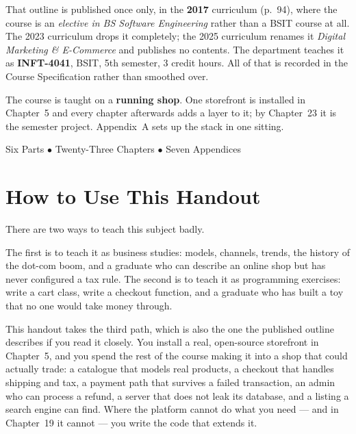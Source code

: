 \begin{center}
\begin{tcolorbox}[enhanced, width=0.86\textwidth, colback=lightbg,
  colframe=primary, boxrule=0pt, leftrule=4pt, arc=2pt, top=6pt, bottom=6pt]
\smallskip
That outline is published once only, in the \textbf{2017} curriculum (p.~94),
where the course is an \emph{elective in BS Software Engineering} rather than a
BSIT course at all. The 2023 curriculum drops it completely; the 2025
curriculum renames it \emph{Digital Marketing \& E-Commerce} and publishes no
contents. The department teaches it as \textbf{INFT-4041}, BSIT, 5th semester,
3 credit hours. All of that is recorded in the Course Specification rather
than smoothed over.

\smallskip
The course is taught on a \textbf{running shop}. One storefront is installed in
Chapter~5 and every chapter afterwards adds a layer to it; by Chapter~23 it is
the semester project. Appendix~A sets up the stack in one sitting.
\end{tcolorbox}

\vspace{0.9cm}
{\small\color{gray!60!black}Six Parts $\bullet$ Twenty-Three Chapters $\bullet$ Seven Appendices}
\vspace{1cm}
\end{center}

\newpage

\chapter*{How to Use This Handout}

There are two ways to teach this subject badly.

The first is to teach it as business studies: models, channels, trends, the
history of the dot-com boom, and a graduate who can describe an online shop but
has never configured a tax rule. The second is to teach it as programming
exercises: write a cart class, write a checkout function, and a graduate who has
built a toy that no one would take money through.

This handout takes the third path, which is also the one the published outline
describes if you read it closely. You install a real, open-source storefront in
Chapter~5, and you spend the rest of the course making it into a shop that could
actually trade: a catalogue that models real products, a checkout that handles
shipping and tax, a payment path that survives a failed transaction, an admin
who can process a refund, a server that does not leak its database, and a listing
a search engine can find. Where the platform cannot do what you need --- and in
Chapter~19 it cannot --- you write the code that extends it.

